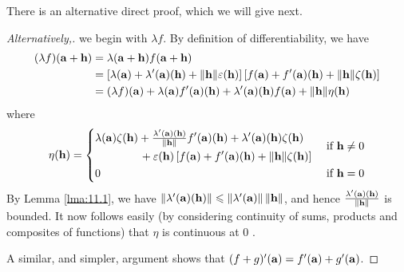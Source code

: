 \documentclass[a4paper]{article}
\begin{document}
There is an alternative direct proof, which we will give next.

\begin{proof}[Alternatively,]
    we begin with $\lambda f$. By definition of differentiability, we have
$$
\begin{aligned}
(\lambda f)({\bf a}+{\bf h}) &=\lambda({\bf a}+{\bf h}) f({\bf a}+{\bf h}) \\
&=\left[\lambda({\bf a})+\lambda^{\prime}({\bf a})({\bf h})+\|{\bf h}\| \varepsilon({\bf h})\right]\left[f({\bf a})+f^{\prime}({\bf a})({\bf h})+\|{\bf h}\| \zeta({\bf h})\right] \\
&=(\lambda f)({\bf a})+\lambda({\bf a}) f^{\prime}({\bf a})({\bf h})+\lambda^{\prime}({\bf a})({\bf h}) f({\bf a})+\|{\bf h}\| \eta({\bf h})
\end{aligned}
$$
where
$$
\eta({\bf h})= \begin{cases}
    \begin{aligned}
        &\lambda({\bf a}) \zeta({\bf h})+\tfrac{\lambda^{\prime}({\bf a})({\bf h})}{\|{\bf h}\|} f^{\prime}({\bf a})({\bf h})+\lambda^{\prime}({\bf a})({\bf h}) \zeta({\bf h})\\ &\hspace{4em}+\varepsilon({\bf h})\left[f({\bf a})+f^{\prime}({\bf a})({\bf h})+\|{\bf h}\| \zeta({\bf h})\right]
    \end{aligned}
    & \text { if } {\bf h} \neq 0 \\[1em] 0 & \text { if } {\bf h}=0\end{cases}
$$
By Lemma \ref{lma:11.1}, we have $\left\|\lambda^{\prime}({\bf a})({\bf h})\right\| \leqslant\left\|\lambda^{\prime}({\bf a})\right\|\|{\bf h}\|$, and hence $\frac{\lambda^{\prime}({\bf a})({\bf h})}{\|{\bf h}\|}$ is bounded. It now follows easily (by considering continuity of sums, products and composites of functions) that $\eta$ is continuous at 0 .

A similar, and simpler, argument shows that $(f+g)^{\prime}({\bf a})=f^{\prime}({\bf a})+g^{\prime}({\bf a})$.
\end{proof}
\end{document}

